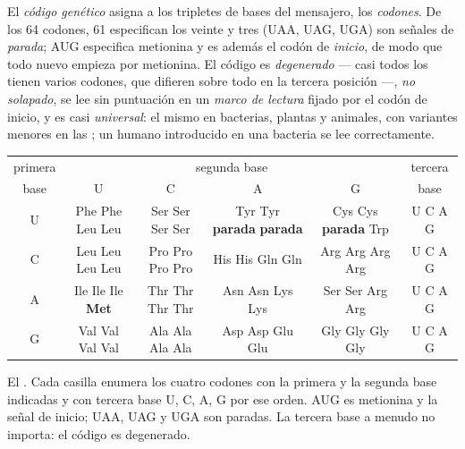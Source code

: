 \begin{definition}\label{def:b1:gene-expression:code}
El \emph{código genético} asigna  a los tripletes de bases del
mensajero, los \emph{codones}. De los 64 codones, 61 especifican los veinte
 y tres (UAA, UAG, UGA) son señales de \emph{parada}; AUG
especifica metionina y es además el codón de \emph{inicio}, de modo que todo
 nuevo empieza por metionina. El código es \emph{degenerado} ---
casi todos los  tienen varios codones, que difieren sobre todo en
la tercera posición ---, \emph{no solapado}, se lee sin puntuación en un
\emph{marco de lectura} fijado por el codón de inicio, y es casi
\emph{universal}: el mismo en bacterias, plantas y animales, con variantes
menores en las ; un  humano introducido en una bacteria se
lee correctamente.
\end{definition}

\begin{omfigure}
\begin{center}
\footnotesize
\begin{tabular}{c|cccc|c}
\hline
primera & \multicolumn{4}{c|}{segunda base} & tercera \\
base & U & C & A & G & base \\
\hline
U & Phe Phe Leu Leu & Ser Ser Ser Ser & Tyr Tyr \textbf{parada} \textbf{parada} & Cys Cys \textbf{parada} Trp & U C A G \\
C & Leu Leu Leu Leu & Pro Pro Pro Pro & His His Gln Gln & Arg Arg Arg Arg & U C A G \\
A & Ile Ile Ile \textbf{Met} & Thr Thr Thr Thr & Asn Asn Lys Lys & Ser Ser Arg Arg & U C A G \\
G & Val Val Val Val & Ala Ala Ala Ala & Asp Asp Glu Glu & Gly Gly Gly Gly & U C A G \\
\hline
\end{tabular}
\end{center}

{\small El . Cada casilla enumera los cuatro codones con la
primera y la segunda base indicadas y con tercera base U, C, A, G por ese
orden. AUG es metionina y la señal de inicio; UAA, UAG y UGA son paradas. La
tercera base a menudo no importa: el código es degenerado.}
\end{omfigure}

